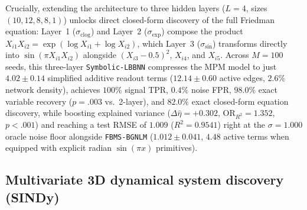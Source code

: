 \documentclass[11pt,a4paper]{article}
\begin{document}
Crucially, extending the architecture to three hidden layers ($L = 4$, sizes $(10, 12, 8, 8, 1)$) unlocks direct closed-form discovery of the full Friedman equation: Layer~1 ($\sigma_{\text{clog}}$) and Layer~2 ($\sigma_{\exp}$) compose the product $X_{i1} X_{i2} = \exp(\log X_{i1} + \log X_{i2})$, which Layer~3 ($\sigma_{\sin}$) transforms directly into $\sin(\pi X_{i1} X_{i2})$ alongside $(X_{i3} - 0.5)^2$, $X_{i4}$, and $X_{i5}$. Across $M = 100$ seeds, this three-layer \texttt{Symbolic-LBBNN} compresses the MPM model to just $4.02 \pm 0.14$ simplified additive readout terms ($12.14 \pm 0.60$ active edges, $2.6\%$ network density), achieves $100\%$ signal TPR, $0.4\%$ noise FPR, $98.0\%$ exact variable recovery ($p = .003$ vs.\ 2-layer), and $82.0\%$ exact closed-form equation discovery, while boosting explained variance ($\Delta\hat{\eta} = +0.302$, $\mathrm{OR}_{R^2} = 1.352$, $p < .001$) and reaching a test RMSE of $1.009$ ($R^2 = 0.9541$) right at the $\sigma = 1.000$ oracle noise floor alongside \texttt{FBMS-BGNLM} ($1.012 \pm 0.041$, $4.48$ active terms when equipped with explicit radian $\sin(\pi x)$ primitives).

\subsection{Multivariate 3D dynamical system discovery (SINDy)}
\label{sec:exp:sindy3d}
\end{document}
